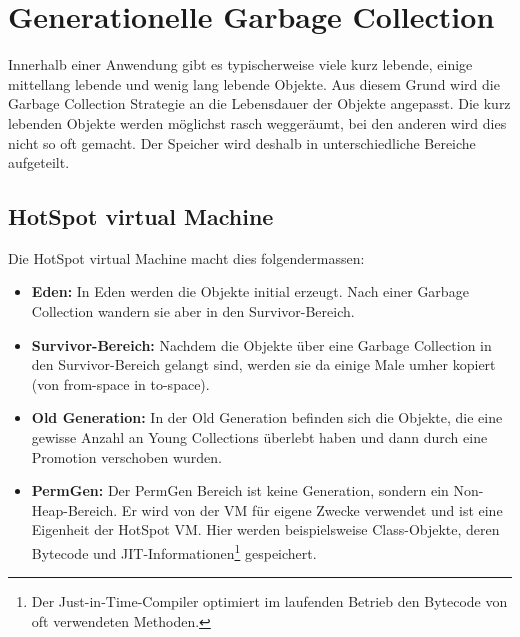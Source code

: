 \section{Generationelle Garbage Collection}\label{generational gc}
Innerhalb einer Anwendung gibt es typischerweise viele kurz lebende, einige mittellang lebende und wenig lang lebende Objekte. Aus diesem Grund wird die Garbage Collection Strategie an die Lebensdauer der Objekte angepasst. Die kurz lebenden Objekte werden möglichst rasch weggeräumt, bei den anderen wird dies nicht so oft gemacht. Der Speicher wird deshalb in unterschiedliche Bereiche aufgeteilt. 
\subsection{HotSpot virtual Machine}
Die HotSpot virtual Machine macht dies folgendermassen\cite{langerkreft201003}:

\begin{itemize}
	\item \textbf{Eden:} In Eden werden die Objekte initial erzeugt. Nach einer Garbage Collection wandern sie aber in den Survivor-Bereich.
	\item \textbf{Survivor-Bereich:} Nachdem die Objekte über eine Garbage Collection in den Survivor-Bereich gelangt sind, werden sie da einige Male umher kopiert (von from-space in to-space).
	\item \textbf{Old Generation:} In der Old Generation befinden sich die Objekte, die eine gewisse Anzahl an Young Collections überlebt haben und dann durch eine Promotion verschoben wurden.
	\item  \textbf{PermGen:} Der PermGen Bereich ist keine Generation, sondern ein Non-Heap-Bereich. Er wird von der VM für eigene Zwecke verwendet und ist eine Eigenheit der HotSpot VM. Hier werden beispielsweise Class-Objekte, deren Bytecode und JIT-Informationen\footnote{Der Just-in-Time-Compiler optimiert im laufenden Betrieb den Bytecode von oft verwendeten Methoden.} gespeichert.
\end{itemize}

